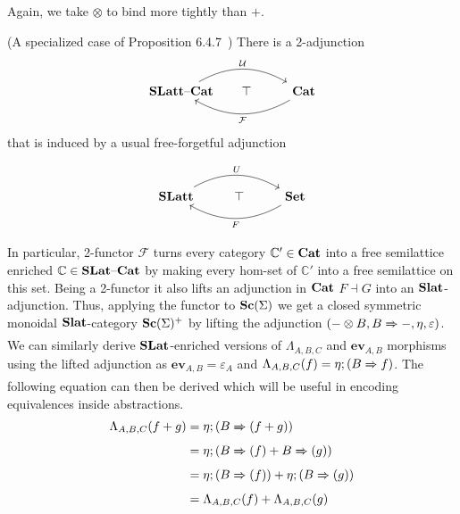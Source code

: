     Again, we take $\otimes$ to bind more tightly than $+$.
    
    \begin{proposition}(A specialized case of Proposition 6.4.7~\cite{Borceux_1994})
    There is a 2-adjunction 
    \[\begin{tikzcd}
        \catname{SLatt}\text{--}\catname{Cat}\arrow[rr, "\mathcal{U}", bend left] & \hspace{-1em}\top & \catname{Cat} \arrow[ll, "\mathcal{F}", bend left]
        \end{tikzcd}
    \]
    that is induced by a usual free-forgetful adjunction 
    
    \[\begin{tikzcd}
        \catname{SLatt} \arrow[rr, "U", bend left] & \top & \catname{Set} \arrow[ll, "F", bend left]
        \end{tikzcd}
    \]
    \end{proposition}
    
In particular, 2-functor $\mathcal{F}$ turns every category $\mathbb{C'} \in \mathbf{Cat}$ into a free semilattice enriched $\mathbb{C} \in \mathbf{SLat}\text{--}\mathbf{Cat}$ by making every hom-set of $\mathbb{C'}$ into a free semilattice on this set.
Being a 2-functor it also lifts an adjunction in $\mathbf{Cat}$ $F \dashv G$ into an $\mathbf{Slat}$-adjunction.
Thus, applying the functor to $\mathbf{Sc}(\Sigma)$ we get a closed symmetric monoidal $\mathbf{Slat}$-category $\mathbf{Sc}(\Sigma)^{+}$ by lifting the adjunction $(- \otimes B, B \xRightarrow{} -, \eta, \varepsilon)$.
We can similarly derive $\mathbf{SLat}$-enriched versions of  $\Lambda_{A,B,C}$ and $\textbf{ev}_{A,B}$ morphisms using the lifted adjunction as $\textbf{ev}_{A,B} = \varepsilon_{A}$ and $\Lambda_{A,B,C}(f) = \eta; (B \xRightarrow{} f)$.
The following equation can then be derived which will be useful in encoding equivalences inside abstractions.
\begin{align*}
\Lambda_{A,B,C}(f + g) &= \eta;(B \xRightarrow{} (f + g))\\
                       &= \eta;(B \xRightarrow{} (f) + B \xRightarrow{} (g))\\
                       &= \eta;(B \xRightarrow{} (f)) + \eta;(B \xRightarrow{} (g))\\
                       &= \Lambda_{A,B,C}(f) + \Lambda_{A,B,C}(g)
\end{align*}


